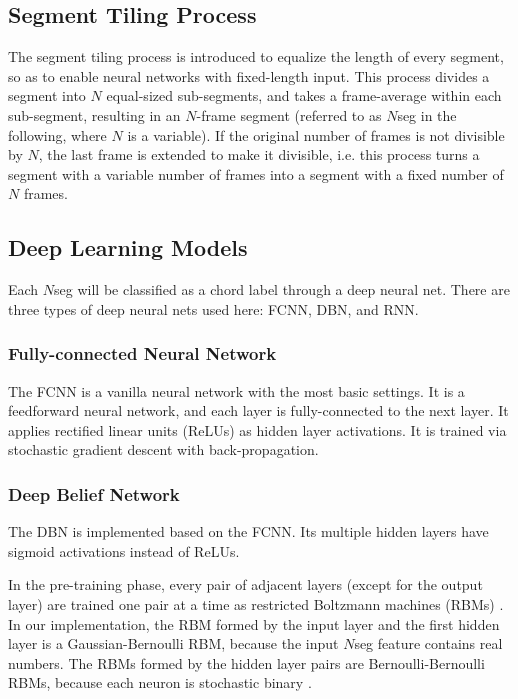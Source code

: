 
\subsection{Segment Tiling Process} \label{sec:3-seg-tile}

The segment tiling process is introduced to equalize the length of every segment, so as to enable neural networks with fixed-length input. This process divides a segment into $N$ equal-sized sub-segments, and takes a frame-average within each sub-segment, resulting in an $N$-frame segment (referred to as $N$seg in the following, where $N$ is a variable). If the original number of frames is not divisible by $N$, the last frame is extended to make it divisible, i.e. this process turns a segment with a variable number of frames into a segment with a fixed number of $N$ frames.

\subsection{Deep Learning Models} \label{sec:3-dlmodel}

Each $N$seg will be classified as a chord label through a deep neural net. There are three types of deep neural nets used here:  FCNN, DBN, and RNN.

\subsubsection{Fully-connected Neural Network}

The FCNN is a vanilla neural network with the most basic settings. It is a feedforward neural network, and each layer is fully-connected to the next layer. It applies rectified linear units (ReLUs) as hidden layer activations. It is trained via stochastic gradient descent with back-propagation.

\subsubsection{Deep Belief Network}

The DBN is implemented based on the FCNN. Its multiple hidden layers have sigmoid activations instead of ReLUs.

In the pre-training phase, every pair of adjacent layers (except for the output layer) are trained one pair at a time as restricted Boltzmann machines (RBMs) \cite{hinton2006fast}. In our implementation, the RBM formed by the input layer and the first hidden layer is a Gaussian-Bernoulli RBM, because the input $N$seg feature contains real numbers. The RBMs formed by the hidden layer pairs are Bernoulli-Bernoulli RBMs, because each neuron is stochastic binary \cite{hinton2006reducing}.

